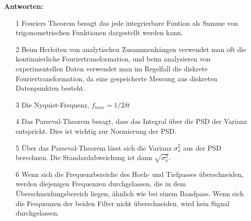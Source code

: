 \begin{tcolorbox}[enhanced,width=6in,
    fontupper=\small,drop fuzzy shadow southwest,
    colframe=black!50!black,colback=black!5]
\textbf{Antworten:} \\
\begin{enumerate}
\item[1] Fouriers Theorem besagt das jede integrierbare Funtion als Summe von trigonometrischen Funktionen dargestellt werden kann. 
\item[2] Beim Herleiten von analytischen Zusammenhängen verwendet man oft die kontinuierliche Fouriertransformation, und beim analysieren von experimentellen Daten verwendet man im Regelfall die diskrete Fouriertransformation, da eine gespeicherte Messung aus diskreten Datenpunkten besteht.  
\item[3] Die Nyquist-Frequenz, $f_{max} = 1/2\delta t$
\item[4] Das Parseval-Theorem besagt, dass das Integral über die PSD der Varianz entspricht. Dies ist wichtig zur Normierung der PSD. 
\item[5] Über das Parseval-Theorem lässt sich die Varianz $\sigma_x^2$ aus der PSD berechnen. Die Standardabweichung ist dann $\sqrt{\sigma_x^2}$. 
\item[6] Wenn sich die Frequenzbereiche des Hoch- und Tiefpasses überschneiden, werden diejenigen Frequenzen durchgelassen, die in dem Überschneidungsbereich liegen, ähnlich wie bei einem Bandpass. Wenn sich die Frequenzen der beiden Filter nicht überschneiden, wird kein Signal durchgelassen. 
\end{enumerate}
\end{tcolorbox}